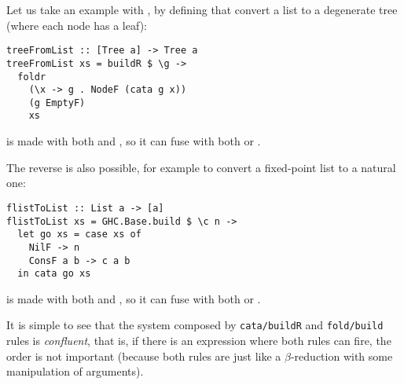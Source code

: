 Let us take an example with , by defining  that convert a list to a degenerate tree (where each node has a leaf):
\begin{verbatim}
treeFromList :: [Tree a] -> Tree a
treeFromList xs = buildR $ \g ->
  foldr 
    (\x -> g . NodeF (cata g x))
    (g EmptyF)
    xs
\end{verbatim}

 is made with both  and , so it can fuse with both  or .

The reverse is also possible, for example to convert a fixed-point list to a natural one:
\begin{verbatim}
flistToList :: List a -> [a]
flistToList xs = GHC.Base.build $ \c n ->
  let go xs = case xs of
    NilF -> n
    ConsF a b -> c a b
  in cata go xs
\end{verbatim}

 is made with both  and , so it can fuse with both  or .

It is simple to see that the system composed by \verb|cata/buildR| and \verb|fold/build| rules is \emph{confluent}, that is, if there is an expression where both rules can fire, the order is not important (because both rules are just like a $\beta$-reduction with some manipulation of arguments).